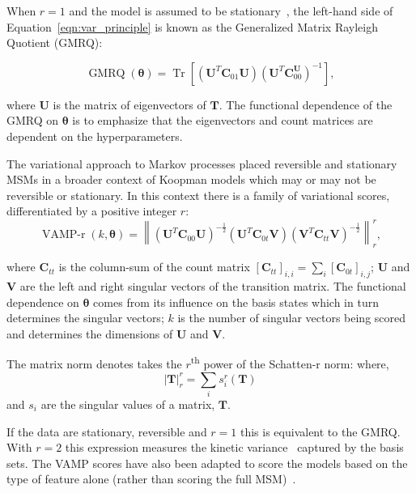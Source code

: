 \documentclass[journal=jacsat,manuscript=article]{achemso}
\begin{document}
When $r=1$ and the model is assumed to be stationary~\cite{mcgibbonVariationalCrossvalidationSlow2015}, the left-hand side of Equation~\ref{eqn:var_principle} is known as the Generalized Matrix Rayleigh Quotient (GMRQ):

\begin{equation}
    \operatorname{GMRQ}(\bm{\theta}) = \operatorname{Tr}\left[(\mathbf{U}^{T}\mathbf{C}_{01}\mathbf{U})(\mathbf{U}^{T}\mathbf{C}_{00}^\mathbf{U})^{-1}\right], \label{eqn:gmrq_def}
\end{equation}

where $\mathbf{U}$ is the matrix of eigenvectors of $\mathbf{T}$. The functional dependence of the GMRQ on $\bm{\theta}$ is to emphasize that the eigenvectors and count matrices are dependent on the hyperparameters. 

The variational approach to Markov processes placed reversible and stationary MSMs in a broader context of Koopman models which may or may not be reversible or stationary.  In this context there is a family of variational scores, differentiated by a positive integer $r$: 
\begin{equation}
     \operatorname{VAMP-r}(k, \bm{\theta}) = \left \| (\mathbf{U}^{T}\mathbf{C}_{00}\mathbf{U})^{-\frac{1}{2}}(\mathbf{U}^{T}\mathbf{C}_{0t}\mathbf{V})(\mathbf{V}^{T}\mathbf{C}_{tt}\mathbf{V})^{-\frac{1}{2}} \right \|_{r}^{r}, \label{eqn:vamp_def}
\end{equation}

where $\mathbf{C}_{tt}$ is the column-sum of the count matrix $[\mathbf{C}_{tt}]_{i, i} = \sum_i [\mathbf{C}_{0t}]_{i, j}$; $\mathbf{U}$ and $\mathbf{V}$ are the left and right singular vectors of the transition matrix. The functional dependence on $\bm{\theta}$ comes from its influence on the basis states which in turn determines the singular vectors; $k$ is the number of singular vectors being scored and determines the dimensions of $\mathbf{U}$ and $\mathbf{V}$.  

The matrix norm denotes takes the $r$\textsuperscript{th} power of the Schatten-r norm: 
where,
\begin{equation}
    \left | \boldsymbol{T} \right |_{r}^{r} = \sum_{i}s_i^r(\boldsymbol{T})
\end{equation}
and $s_i$ are the singular values of a matrix, $\boldsymbol{T}$. 

If the data are stationary, reversible and $r{=}1$ this is equivalent to the GMRQ. With $r{=}2$ this expression measures the kinetic variance~\cite{noeKineticDistanceKinetic2015} captured by the basis sets. The VAMP scores have also been adapted to score the models based on the type of feature alone (rather than scoring the full MSM)~\cite{scherer_variational_2019}. 
\end{document}
